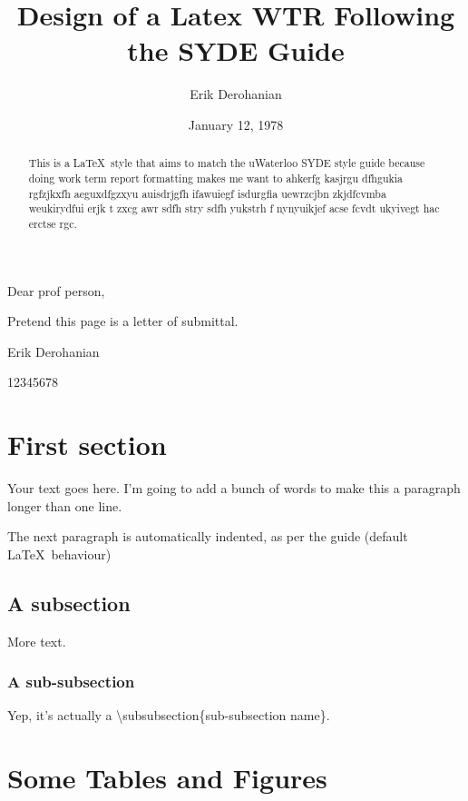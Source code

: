 \documentclass[twoside, 12pt]{article}
\title{Design of a Latex WTR Following the SYDE Guide}
\author{Erik Derohanian}
\date{January 12, 1978}
\begin{document}
	\makewtrtitle

	Dear prof person,

	Pretend this page is a letter of submittal.

	Erik Derohanian

	12345678

	\newpage

	\begin{abstract}
		This is a \LaTeX\ style that aims to match the uWaterloo SYDE style guide because doing work term report formatting makes me want to ahkerfg kasjrgu dfhgukia rgfzjkxfh aeguxdfgzxyu auisdrjgfh ifawuiegf isdurgfia uewrzcjbn zkjdfcvmba weukirydfui erjk t  zxcg awr sdfh stry sdfh yukstrh f nynyuikjef acse fcvdt ukyivegt hac erctse rgc.
	\end{abstract}

	\tableofcontents
	\newpage

	\listoffigures
	\newpage
	\listoftables
	\newpage

	\startarabicpagenumbers

	\section{First section}

	Your text goes here. I'm going to add a bunch of words to make this a paragraph longer than one line.

	The next paragraph is automatically indented, as per the guide (default \LaTeX\ behaviour)

	\subsection{A subsection}

	More text.

	\subsubsection{A sub-subsection}

	Yep, it's actually a \textbackslash subsubsection\{sub-subsection name\}.

	\section{Some Tables and Figures}
\end{document}

